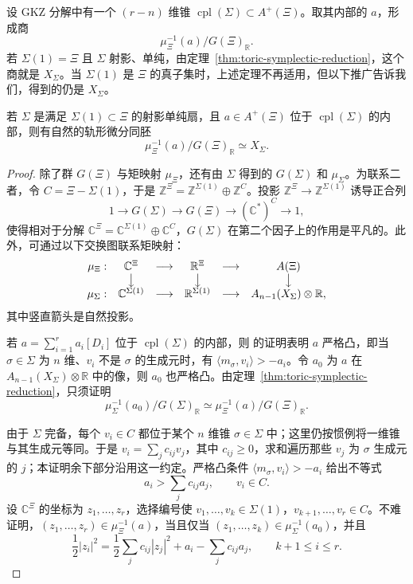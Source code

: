 设 GKZ 分解中有一个 $(r-n)$ 维锥 $\operatorname{cpl}(\Sigma)\subset A^+(\Xi)$。取其内部的 $a$，形成商
\[
\mu_\Xi^{-1}(a)/G(\Xi)_{\mathbb R}.
\]
若 $\Sigma(1)=\Xi$ 且 $\Sigma$ 射影、单纯，由定理~\ref{thm:toric-symplectic-reduction}，这个商就是 $X_\Sigma$。当 $\Sigma(1)$ 是 $\Xi$ 的真子集时，上述定理不再适用，但以下推广告诉我们，得到的仍是 $X_\Sigma$。

\begin{theorem}\label{thm:gkz-symplectic-reduction}
若 $\Sigma$ 是满足 $\Sigma(1)\subset\Xi$ 的射影单纯扇，且 $a\in A^+(\Xi)$ 位于 $\operatorname{cpl}(\Sigma)$ 的内部，则有自然的轨形微分同胚
\[
\mu_\Xi^{-1}(a)/G(\Xi)_{\mathbb R}\simeq X_\Sigma.
\]
\end{theorem}
\begin{proof}
除了群 $G(\Xi)$ 与矩映射 $\mu_\Xi$，还有由 $\Sigma$ 得到的 $G(\Sigma)$ 和 $\mu_\Sigma$。为联系二者，令 $C=\Xi-\Sigma(1)$，于是 $\mathbb Z^\Xi=\mathbb Z^{\Sigma(1)}\oplus\mathbb Z^C$。投影 $\mathbb Z^\Xi\to\mathbb Z^{\Sigma(1)}$ 诱导正合列
\begin{equation}\label{eq:gkz-group-sequence}
1\longrightarrow G(\Sigma)\longrightarrow G(\Xi)
\longrightarrow(\mathbb C^*)^C\longrightarrow1,
\end{equation}
使得相对于分解 $\mathbb C^\Xi=\mathbb C^{\Sigma(1)}\oplus\mathbb C^C$，$G(\Sigma)$ 在第二个因子上的作用是平凡的。此外，可通过以下交换图联系矩映射：
\[
\begin{array}{rccccc}
\mu_\Xi:&\mathbb C^\Xi&\longrightarrow&\mathbb R^\Xi&\longrightarrow&A(\Xi)\\
&\big\downarrow&&\big\downarrow&&\big\downarrow\\
\mu_\Sigma:&\mathbb C^{\Sigma(1)}&\longrightarrow&\mathbb R^{\Sigma(1)}
&\longrightarrow&A_{n-1}(X_\Sigma)\otimes\mathbb R,
\end{array}
\]
其中竖直箭头是自然投影。

若 $a=\sum_{i=1}^r a_i[D_i]$ 位于 $\operatorname{cpl}(\Sigma)$ 的内部，则  的证明表明 $a$ 严格凸，即当 $\sigma\in\Sigma$ 为 $n$ 维、$v_i$ 不是 $\sigma$ 的生成元时，有 $\langle m_\sigma,v_i\rangle>-a_i$。令 $a_0$ 为 $a$ 在 $A_{n-1}(X_\Sigma)\otimes\mathbb R$ 中的像，则 $a_0$ 也严格凸。由定理~\ref{thm:toric-symplectic-reduction}，只须证明
\[
\mu_\Sigma^{-1}(a_0)/G(\Sigma)_{\mathbb R}
\simeq\mu_\Xi^{-1}(a)/G(\Xi)_{\mathbb R}.
\]

由于 $\Sigma$ 完备，每个 $v_i\in C$ 都位于某个 $n$ 维锥 $\sigma\in\Sigma$ 中；这里仍按惯例将一维锥与其生成元等同。于是 $v_i=\sum_j c_{ij}v_j$，其中 $c_{ij}\geq0$，求和遍历那些 $v_j$ 为 $\sigma$ 生成元的 $j$；本证明余下部分沿用这一约定。严格凸条件 $\langle m_\sigma,v_i\rangle>-a_i$ 给出不等式
\[
a_i>\sum_j c_{ij}a_j,\qquad v_i\in C.
\]
设 $\mathbb C^\Xi$ 的坐标为 $z_1,\ldots,z_r$，选择编号使 $v_1,\ldots,v_k\in\Sigma(1)$，$v_{k+1},\ldots,v_r\in C$。不难证明，$(z_1,\ldots,z_r)\in\mu_\Xi^{-1}(a)$，当且仅当 $(z_1,\ldots,z_k)\in\mu_\Sigma^{-1}(a_0)$，并且
\begin{equation}\label{eq:gkz-extra-coordinates}
\frac12|z_i|^2=\frac12\sum_j c_{ij}|z_j|^2
+a_i-\sum_j c_{ij}a_j,
\qquad k+1\leq i\leq r.
\end{equation}


\end{proof}
